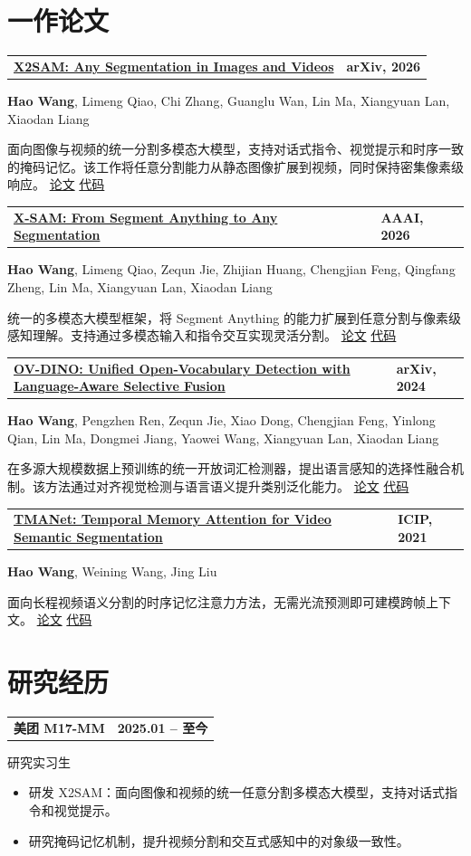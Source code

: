\documentclass[UTF8,10pt,letterpaper,fontset=fandol]{ctexart}
\makeatletter
\newcommand{\datebadge}[1]{%
  \begingroup
  \textcolor{muted}{\footnotesize\bfseries #1}%
  \endgroup
}
\newcommand{\cvitem}[4]{%
  \Needspace{7\baselineskip}
  \vspace{3pt}
  \begin{tabularx}{\textwidth}{@{}>{\RaggedRight\arraybackslash}X>{\RaggedLeft\arraybackslash}p{0.23\textwidth}@{}}
    \textbf{\color{ink}#1} & \datebadge{#2}
  \end{tabularx}
  \vspace{0pt}
  {\small\color{muted}#3}\par
  \vspace{0.6pt}
  #4
}
\newcommand{\publication}[5]{%
  \Needspace{5\baselineskip}
  \vspace{2pt}
  \begin{tabularx}{\textwidth}{@{}>{\RaggedRight\arraybackslash}X>{\RaggedLeft\arraybackslash}p{0.18\textwidth}@{}}
    \textbf{\href{#1}{\color{ink}#2}} & \datebadge{#3}
  \end{tabularx}
  {\small #4}\par
  \vspace{1pt}
  {\small\color{muted}#5}\par
  \vspace{5pt}
}
\makeatother
\begin{document}
\section{一作论文}
\publication
  {https://wanghao9610.github.io/X2SAM/}
  {X2SAM: Any Segmentation in Images and Videos}
  {arXiv, 2026}
  {\textbf{Hao Wang}, Limeng Qiao, Chi Zhang, Guanglu Wan, Lin Ma, Xiangyuan Lan, Xiaodan Liang}
  {面向图像与视频的统一分割多模态大模型，支持对话式指令、视觉提示和时序一致的掩码记忆。该工作将任意分割能力从静态图像扩展到视频，同时保持密集像素级响应。 \href{https://arxiv.org/abs/2605.00891}{论文} \textbar{} \href{https://github.com/wanghao9610/X2SAM}{代码}}

\publication
  {https://wanghao9610.github.io/X-SAM/}
  {X-SAM: From Segment Anything to Any Segmentation}
  {AAAI, 2026}
  {\textbf{Hao Wang}, Limeng Qiao, Zequn Jie, Zhijian Huang, Chengjian Feng, Qingfang Zheng, Lin Ma, Xiangyuan Lan, Xiaodan Liang}
  {统一的多模态大模型框架，将 Segment Anything 的能力扩展到任意分割与像素级感知理解。支持通过多模态输入和指令交互实现灵活分割。 \href{https://arxiv.org/abs/2508.04655}{论文} \textbar{} \href{https://github.com/wanghao9610/X-SAM}{代码}}

\publication
  {https://wanghao9610.github.io/OV-DINO/}
  {OV-DINO: Unified Open-Vocabulary Detection with Language-Aware Selective Fusion}
  {arXiv, 2024}
  {\textbf{Hao Wang}, Pengzhen Ren, Zequn Jie, Xiao Dong, Chengjian Feng, Yinlong Qian, Lin Ma, Dongmei Jiang, Yaowei Wang, Xiangyuan Lan, Xiaodan Liang}
  {在多源大规模数据上预训练的统一开放词汇检测器，提出语言感知的选择性融合机制。该方法通过对齐视觉检测与语言语义提升类别泛化能力。 \href{https://arxiv.org/abs/2407.07844}{论文} \textbar{} \href{https://github.com/wanghao9610/OV-DINO}{代码}}

\publication
  {https://wanghao9610.github.io/TMANet/}
  {TMANet: Temporal Memory Attention for Video Semantic Segmentation}
  {ICIP, 2021}
  {\textbf{Hao Wang}, Weining Wang, Jing Liu}
  {面向长程视频语义分割的时序记忆注意力方法，无需光流预测即可建模跨帧上下文。 \href{https://arxiv.org/abs/2102.08643}{论文} \textbar{} \href{https://github.com/wanghao9610/TMANet}{代码}}

\newpage
\section{研究经历}
\cvitem
  {美团 M17-MM}
  {2025.01 -- 至今}
  {研究实习生}
  {\begin{itemize}
    \item 研发 X2SAM：面向图像和视频的统一任意分割多模态大模型，支持对话式指令和视觉提示。
    \item 研究掩码记忆机制，提升视频分割和交互式感知中的对象级一致性。
  \end{itemize}}
\end{document}

